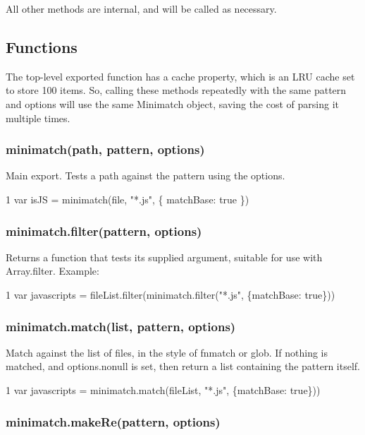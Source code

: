 All other methods are internal, and will be called as necessary.

\subsection*{Functions}

The top-\/level exported function has a {\ttfamily cache} property, which is an L\+R\+U cache set to store 100 items. So, calling these methods repeatedly with the same pattern and options will use the same Minimatch object, saving the cost of parsing it multiple times.

\subsubsection*{minimatch(path, pattern, options)}

Main export. Tests a path against the pattern using the options.


\begin{DoxyCode}
1 var isJS = minimatch(file, "*.js", \{ matchBase: true \})
\end{DoxyCode}


\subsubsection*{minimatch.\+filter(pattern, options)}

Returns a function that tests its supplied argument, suitable for use with {\ttfamily Array.\+filter}. Example\+:


\begin{DoxyCode}
1 var javascripts = fileList.filter(minimatch.filter("*.js", \{matchBase: true\}))
\end{DoxyCode}


\subsubsection*{minimatch.\+match(list, pattern, options)}

Match against the list of files, in the style of fnmatch or glob. If nothing is matched, and options.\+nonull is set, then return a list containing the pattern itself.


\begin{DoxyCode}
1 var javascripts = minimatch.match(fileList, "*.js", \{matchBase: true\}))
\end{DoxyCode}


\subsubsection*{minimatch.\+make\+Re(pattern, options)}

